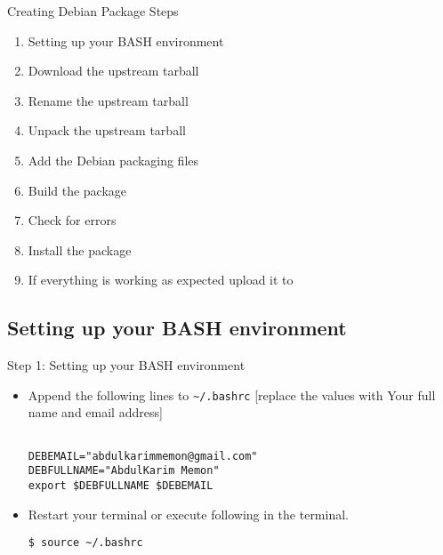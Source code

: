 \documentclass[red,10pt,a4paper]{beamer}
\begin{document}
\begin{frame}{Creating Debian Package Steps}
\begin{enumerate}
	\item Setting up your BASH environment
	\item Download the upstream tarball
	\item Rename the upstream tarball
	\item Unpack the upstream tarball
	\item Add the Debian packaging files
	\item Build the package
	\item Check for errors
	\item Install the package
	\item If everything is working as expected upload it to 
\end{enumerate}

\end{frame}

\subsection{Setting up your BASH environment}

\begin{frame}[fragile]{Step 1: Setting up your BASH environment}
\begin{itemize}
\item Append the following lines to \lstinline|~/.bashrc| \newline
\alert{[replace the values with Your full name and email address]}

\begin{lstlisting}

DEBEMAIL="abdulkarimmemon@gmail.com"
DEBFULLNAME="AbdulKarim Memon"
export $DEBFULLNAME $DEBEMAIL
    \end{lstlisting} 

\item Restart your terminal or execute following in the terminal.

\begin{lstlisting}
$ source ~/.bashrc
\end{lstlisting}

\end{itemize}
\end{frame}
\end{document}
